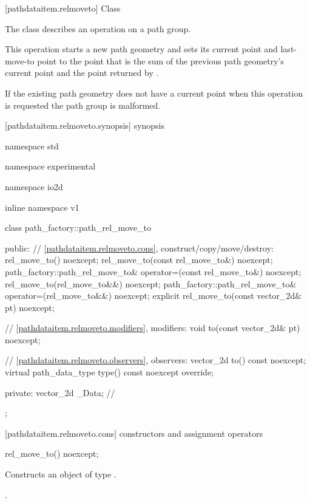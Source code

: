  [pathdataitem.relmoveto] {Class }

\pnum
{}
The class  describes an operation on a path group.

\pnum
This operation starts a new path geometry and sets its current point and last-move-to point to the point that is the sum of the previous path geometry's current point and the point returned by .

\pnum
If the existing path geometry does not have a current point when this operation is requested the path group is malformed.

 [pathdataitem.relmoveto.synopsis] { synopsis}

\begin{codeblock}
namespace std { namespace experimental { namespace io2d { inline namespace v1 {
  class path_factory::path_rel_move_to {
  public:
    // \ref{pathdataitem.relmoveto.cons}, construct/copy/move/destroy:
    rel_move_to() noexcept;
    rel_move_to(const rel_move_to&) noexcept;
    path_factory::path_rel_move_to& operator=(const rel_move_to&) noexcept;
    rel_move_to(rel_move_to&&) noexcept;
    path_factory::path_rel_move_to& operator=(rel_move_to&&) noexcept;
    explicit rel_move_to(const vector_2d& pt) noexcept;

    // \ref{pathdataitem.relmoveto.modifiers}, modifiers:
    void to(const vector_2d& pt) noexcept;

    // \ref{pathdataitem.relmoveto.observers}, observers:
    vector_2d to() const noexcept;
    virtual path_data_type type() const noexcept override;
    
  private:
    vector_2d _Data; // \expos
  };
} } } }
\end{codeblock}

 [pathdataitem.relmoveto.cons] { constructors and assignment operators}

\begin{itemdecl}
    rel_move_to() noexcept;
\end{itemdecl}
\begin{itemdescr}
	\pnum
	\effects
	Constructs an object of type .
	
	\pnum
	\postconditions
	.
\end{itemdescr}

